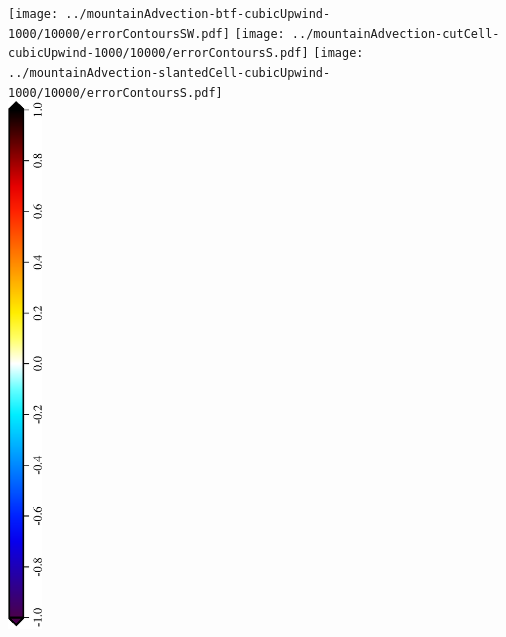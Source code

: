 \documentclass{article}
\begin{document}
\texttt{[image: ../mountainAdvection-btf-cubicUpwind-1000/10000/errorContoursSW.pdf]}
\texttt{[image: ../mountainAdvection-cutCell-cubicUpwind-1000/10000/errorContoursS.pdf]}
\texttt{[image: ../mountainAdvection-slantedCell-cubicUpwind-1000/10000/errorContoursS.pdf]} \\
\centering
\includegraphics[height=5.5in,angle=270]{mountainAdvectionErrorLegend.eps}
\end{document}
